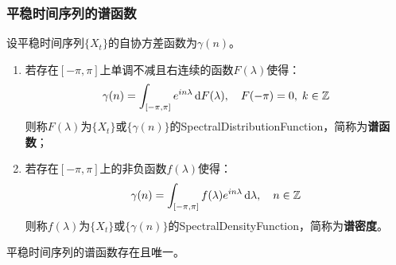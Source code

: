 \subsubsection{平稳时间序列的谱函数}
\begin{definition}
	设平稳时间序列$\{X_t\}$的自协方差函数为$\gamma(n)$。
	\begin{enumerate}
		\item 若存在$[-\pi,\pi]$上单调不减且右连续的函数$F(\lambda)$使得：
		\begin{equation*}
			\gamma(n)=\int_{[-\pi,\pi]}e^{in\lambda}\mathop{}\!\mathrm{d} F(\lambda),\quad F(-\pi)=0,\;k\in\mathbb{Z}^{}
		\end{equation*}
		则称$F(\lambda)$为$\{X_t\}$或$\{\gamma(n)\}$的\gls{SpectralDistributionFunction}，简称为\textbf{谱函数}；
		\item 若存在$[-\pi,\pi]$上的非负函数$f(\lambda)$使得：
		\begin{equation*}
			\gamma(n)=\int_{[-\pi,\pi]}f(\lambda)e^{in\lambda}\mathop{}\!\mathrm{d}\lambda,\quad n\in\mathbb{Z}^{}
		\end{equation*}
		则称$f(\lambda)$为$\{X_t\}$或$\{\gamma(n)\}$的\gls{SpectralDensityFunction}，简称为\textbf{谱密度}。
	\end{enumerate}
\end{definition}
\begin{theorem}
	平稳时间序列的谱函数存在且唯一。
\end{theorem}
